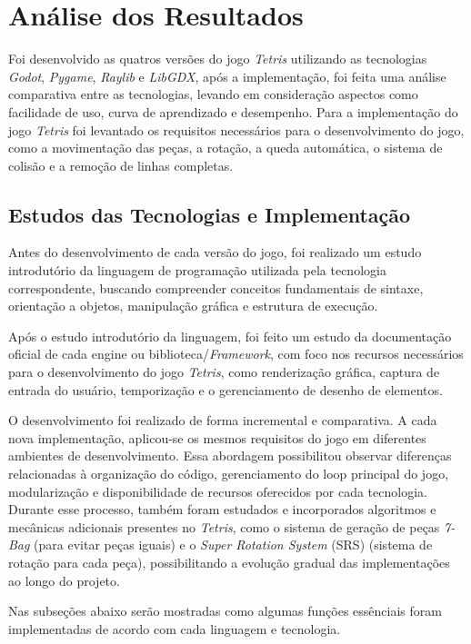 \chapter{Análise dos Resultados}
\label{cap:04}

Foi desenvolvido as quatros versões do jogo \textit{Tetris} utilizando as tecnologias \textit{Godot}, \textit{Pygame}, \textit{Raylib} e \textit{LibGDX}, após a implementação, foi feita uma análise comparativa entre as tecnologias, levando em consideração aspectos como facilidade de uso, curva de aprendizado e desempenho.
Para a implementação do jogo \textit{Tetris} foi levantado os requisitos necessários para o desenvolvimento do jogo, como a movimentação das peças, a rotação, a queda automática, o sistema de colisão e a remoção de linhas completas.

\section{Estudos das Tecnologias e Implementação}

Antes do desenvolvimento de cada versão do jogo, foi realizado um estudo introdutório da linguagem de programação utilizada pela tecnologia correspondente, buscando compreender conceitos fundamentais de sintaxe, orientação a objetos, manipulação gráfica e estrutura de execução.

Após o estudo introdutório da linguagem, foi feito um estudo da documentação oficial de cada engine ou biblioteca/\textit{Framework}, com foco nos recursos necessários para o desenvolvimento do jogo \textit{Tetris}, como renderização gráfica, captura de entrada do usuário, temporização e o gerenciamento de desenho de elementos.

O desenvolvimento foi realizado de forma incremental e comparativa. A cada nova implementação, aplicou-se os mesmos requisitos do jogo em diferentes ambientes de desenvolvimento. Essa abordagem possibilitou observar diferenças relacionadas à organização do código, gerenciamento do loop principal do jogo, modularização e disponibilidade de recursos oferecidos por cada tecnologia. Durante esse processo, também foram estudados e incorporados algoritmos e mecânicas adicionais presentes no \textit{Tetris}, como o sistema de geração de peças \textit{7-Bag} (para evitar peças iguais) e o \textit{Super Rotation System} (SRS) (sistema de rotação para cada peça), possibilitando a evolução gradual das implementações ao longo do projeto.

Nas subseções abaixo serão mostradas como algumas funções essênciais foram implementadas de acordo com cada linguagem e tecnologia.


